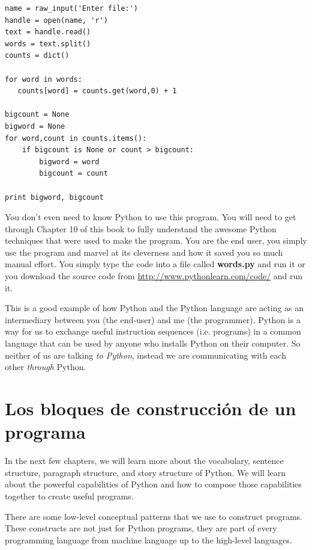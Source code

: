 \beforeverb
\begin{verbatim}
name = raw_input('Enter file:')
handle = open(name, 'r')
text = handle.read()
words = text.split()
counts = dict()

for word in words:
   counts[word] = counts.get(word,0) + 1

bigcount = None
bigword = None
for word,count in counts.items():
    if bigcount is None or count > bigcount:
        bigword = word
        bigcount = count

print bigword, bigcount
\end{verbatim}
\afterverb
%
You don't even need to know Python to use this program.  You will need to get through 
Chapter 10 of this book to fully understand the awesome Python techniques that were
used to make the program.  You are the end user, you simply use the program and marvel
at its cleverness and how it saved you so much manual effort.
You simply type the code 
into a file called {\bf words.py} and run it or you download the source 
code from \url{http://www.pythonlearn.com/code/} and run it.

This is a good example of how Python and the Python language are acting as an intermediary
between you (the end-user) and me (the programmer).  Python is a way for us to exchange useful
instruction sequences (i.e. programs) in a common language that can be used by anyone who 
installs Python on their computer.  So neither of us are talking {\em to Python},
instead we are communicating with each other {\em through} Python.

\section{Los bloques de construcci\'on de un programa}

In the next few chapters, we will learn more about the vocabulary, sentence structure,
paragraph structure, and story structure of Python.  We will learn about the powerful
capabilities of Python and how to compose those capabilities together to create useful
programs.

There are some low-level conceptual patterns that we use to construct programs.  These
constructs are not just for Python programs, they are part of every programming language
from machine language up to the high-level languages.

